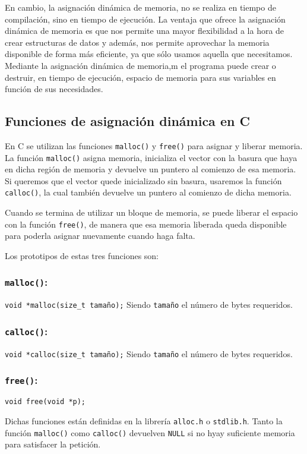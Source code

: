 En cambio, la asignación dinámica de memoria, no se realiza en tiempo de compilación, sino en tiempo de ejecución. La ventaja que ofrece la asignación dinámica de memoria es que nos permite una mayor flexibilidad a la hora de crear estructuras de datos y además, nos permite aprovechar la memoria disponible de forma más eficiente, ya que sólo usamos aquella que necesitamos. Mediante la asignación dinámica de memoria,m el programa puede crear o destruir, en tiempo de ejecución, espacio de memoria para sus variables en función de sus necesidades.
\subsection{Funciones de asignación dinámica en C}{
En C se utilizan las funciones \texttt{malloc()} y \texttt{free()} para asignar y liberar memoria. La función \texttt{malloc()} asigna memoria, inicializa el vector con la basura que haya en dicha región de memoria y devuelve un puntero al comienzo de esa memoria. Si queremos que el vector quede inicializado sin basura, usaremos la función \texttt{calloc()}, la cual también devuelve un puntero al comienzo de dicha memoria.

Cuando se termina de utilizar un bloque de memoria, se puede liberar el espacio con la función \texttt{free()}, de manera que esa memoria liberada queda disponible para poderla asignar nuevamente cuando haga falta.

Los prototipos de estas tres funciones son:
\subsubsection{\texttt{malloc()}:}{\texttt{void *malloc(size\_t tamaño);} Siendo \texttt{tamaño} el número de bytes requeridos.}
\subsubsection{\texttt{calloc()}:}{\texttt{void *calloc(size\_t tamaño);} Siendo \texttt{tamaño} el número de bytes requeridos.}
\subsubsection{\texttt{free()}:}{\texttt{void free(void *p);}\\}


Dichas funciones están definidas en la librería \texttt{alloc.h} o \texttt{stdlib.h}. Tanto la función \texttt{malloc()} como \texttt{calloc()} devuelven \texttt{NULL} si no hyay suficiente memoria para satisfacer la petición.

}
